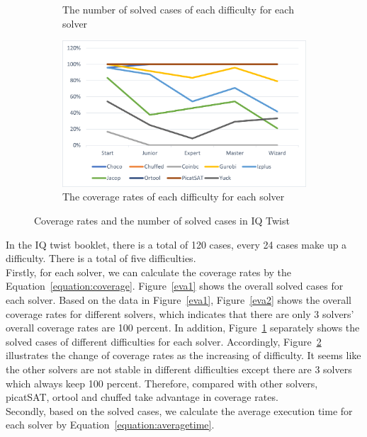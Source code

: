 \begin{figure}[htbp]
\begin{subfigure}[b]{0.48\textwidth}
    \caption{The number of solved cases of each difficulty for each solver}
    \label{eva3}
    \end{subfigure}
    \begin{subfigure}[b]{0.48\textwidth}
    \includegraphics[width=\textwidth]{figs/separated coverage.png}
    \caption{The coverage rates of each difficulty for each solver}
    \label{eva4}
    \end{subfigure}
    \caption{Coverage rates and the number of solved cases in IQ Twist}
    \label{fig:comparisonIQtwist}
\end{figure}
In the IQ twist booklet, there is a total of 120 cases, every 24 cases make up a difficulty. There is a total of five difficulties. 
\\Firstly, for each solver, we can calculate the coverage rates by the Equation~\ref{equation:coverage}.
Figure~\ref{eva1} shows the overall solved cases for each solver. Based on the data in Figure~\ref{eva1}, Figure~\ref{eva2} shows the overall coverage rates for different solvers, which indicates that there are only 3 solvers' overall coverage rates are 100 percent. In addition, Figure~\ref{eva3} separately shows the solved cases of different difficulties for each solver. Accordingly, Figure~\ref{eva4} illustrates the change of coverage rates as the increasing of difficulty. It seems like the other solvers are not stable in different difficulties except there are 3 solvers which always keep 100 percent. Therefore, compared with other solvers, picatSAT, ortool and chuffed take advantage in coverage rates.
\\Secondly, based on the solved cases, we calculate the average execution time for each solver by Equation~\ref{equation:averagetime}.
